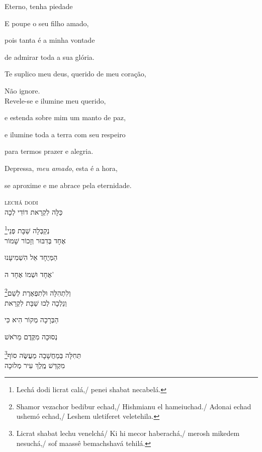 \movetooddpage
\raggedright

\vspace*{1cm}

Eterno, tenha piedade

E poupe o seu filho amado,

pois tanta é a minha vontade

de admirar toda a sua glória.

Te suplico meu deus, querido de meu coração,

Não ignore.\\[10pt]

Revele-se e ilumine meu querido,

e estenda sobre mim um manto de paz,

e ilumine toda a terra com seu respeiro

para termos prazer e alegria. 

Depressa, \emph{meu amado}, esta é a hora,

se aproxime e me abrace pela eternidade.

\movetoevenpage
\raggedleft
{}

\vspace*{1cm}

\textsc{lechá dodi}\\[15pt]

כַּלָּה לִקְרַאת דוֹדִי לְכָה

נְקַבְּלָה שַׁבָּת פְּנֵי\footnote{Lechá dodi licrat calá,/ penei shabat necabelá.}\\[10pt]

אֶחָד בְּדִבּוּר וְזָכוֹר שָׁמוֹר

הַמְּיֻחָד אֵל הִשְׁמִיעָנוּ

אֶחָד וּשְׁמוֹ אֶחָד ה' 

וְלִתְהִלָּה וּלְתִפְאֶרֶת לְשֵׁם\footnote{Shamor vezachor bedibur echad,/ Hishmianu el hameiuchad./ Adonai echad ushemó echad,/ Leshem uletiferet veletehila.}\\[10pt]

וְנֵלְכָה לְכוּ שַׁבָּת לִקְרַאת

הַבְּרָכָה מְקוֹר הִיא כִּי

נְסוּכָה מִקֶּדֶם מֵרֹאשׁ 

תְּחִלָּה בְּמַחֲשָׁבָה מַעֲשֶּׂה סוֹף\footnote{Licrat shabat lechu venelchá/ Ki hi mecor haberachá,/ merosh mikedem nesuchá,/ sof maassê bemachshavá tehilá.}\\[10pt]

מִקְדַּשׁ מֶֽלֶךְ עִיר מְלוּכָה

